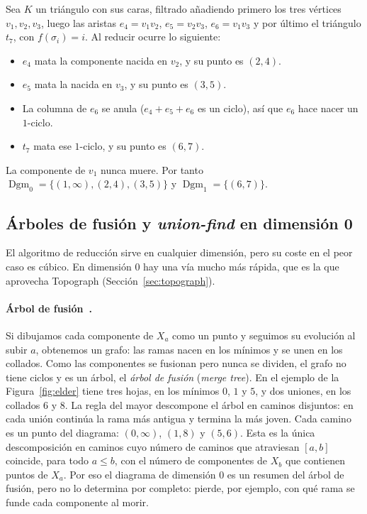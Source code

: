 \begin{ejemplo}
Sea $K$ un triángulo con sus caras, filtrado añadiendo primero los tres
vértices $v_1,v_2,v_3$, luego las aristas $e_4=v_1v_2$, $e_5=v_2v_3$,
$e_6=v_1v_3$ y por último el triángulo $t_7$, con $f(\sigma_i)=i$. Al
reducir ocurre lo siguiente:
\begin{itemize}
  \item $e_4$ mata la componente nacida en $v_2$, y su punto es $(2,4)$.
  \item $e_5$ mata la nacida en $v_3$, y su punto es $(3,5)$.
  \item La columna de $e_6$ se anula ($e_4+e_5+e_6$ es un ciclo), así que
  $e_6$ hace nacer un $1$-ciclo.
  \item $t_7$ mata ese $1$-ciclo, y su punto es $(6,7)$.
\end{itemize}
La componente de $v_1$ nunca muere. Por tanto
$\operatorname{Dgm}_0=\{(1,\infty),(2,4),(3,5)\}$ y
$\operatorname{Dgm}_1=\{(6,7)\}$.
\end{ejemplo}

\subsection{Árboles de fusión y \emph{union-find} en dimensión 0}
\label{sec:persistencia-eficiente}

El algoritmo de reducción sirve en cualquier dimensión, pero su coste en
el peor caso es cúbico. En dimensión $0$ hay una vía mucho más rápida, que
es la que aprovecha Topograph (Sección~\ref{sec:topograph}).

\paragraph{Árbol de fusión~\cite[§VII.1]{edelsbrunner2010}.} Si dibujamos
cada componente de $X_a$ como un punto y seguimos su evolución al subir
$a$, obtenemos un grafo: las ramas nacen en los mínimos y se unen en los
collados. Como las componentes se fusionan pero nunca se dividen, el
grafo no tiene ciclos y es un árbol, el \emph{árbol de fusión}
(\emph{merge tree}). En el ejemplo de la Figura~\ref{fig:elder} tiene tres
hojas, en los mínimos $0$, $1$ y $5$, y dos uniones, en los collados $6$
y $8$. La regla del mayor descompone el árbol en caminos disjuntos: en
cada unión continúa la rama más antigua y termina la más joven. Cada
camino es un punto del diagrama: $(0,\infty)$, $(1,8)$ y $(5,6)$. Esta es
la única descomposición en caminos cuyo número de caminos que atraviesan
$[a,b]$ coincide, para todo $a\le b$, con el número de componentes de
$X_b$ que contienen puntos de $X_a$. Por eso el diagrama de dimensión
$0$ es un resumen del árbol de fusión, pero no lo determina por completo:
pierde, por ejemplo, con qué rama se funde cada componente al morir.

